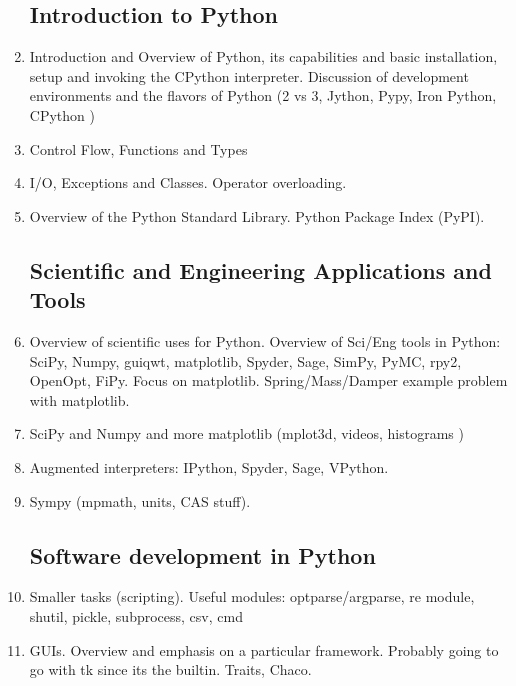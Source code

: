 \begin{enumerate}

\subsection{Introduction to Python}

    \item Introduction and Overview of Python, its capabilities and basic installation, setup and invoking the CPython interpreter. Discussion of development environments and the flavors of Python (2 vs 3, Jython, Pypy, Iron Python, CPython )

    \item Control Flow, Functions and Types

    \item I/O, Exceptions and Classes. Operator overloading.

    \item Overview of the Python Standard Library. Python Package Index (PyPI).

\subsection{Scientific and Engineering Applications and Tools}
    \item Overview of scientific uses for Python. Overview of Sci/Eng tools in Python: SciPy, Numpy, guiqwt, matplotlib, Spyder, Sage, SimPy, PyMC, rpy2, OpenOpt, FiPy. Focus on matplotlib. Spring/Mass/Damper example problem with matplotlib. 

    \item SciPy and Numpy and more matplotlib (mplot3d, videos, histograms )

    \item Augmented interpreters: IPython, Spyder, Sage, VPython.

    \item Sympy (mpmath, units, CAS stuff).

\subsection{Software development in Python}
    \item Smaller tasks (scripting). Useful modules: optparse/argparse, re module, shutil, pickle, subprocess, csv, cmd

    \item GUIs. Overview and emphasis on a particular framework. Probably going to go with tk since its the builtin. Traits, Chaco.


\end{enumerate}

